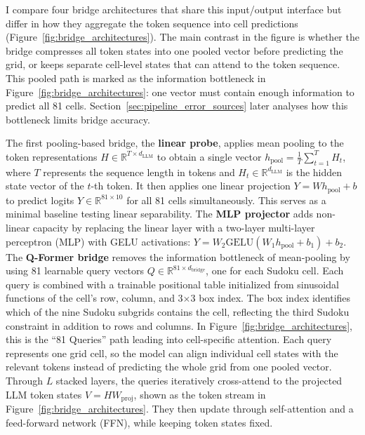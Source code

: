 \documentclass[11pt]{article}
\begin{document}
I compare four bridge architectures that share this input/output interface but differ in how they aggregate the token sequence into cell predictions (Figure~\ref{fig:bridge_architectures}).
The main contrast in the figure is whether the bridge compresses all token states into one pooled vector before predicting the grid, or keeps separate cell-level states that can attend to the token sequence.
This pooled path is marked as the information bottleneck in Figure~\ref{fig:bridge_architectures}: one vector must contain enough information to predict all 81 cells.
Section~\ref{sec:pipeline_error_sources} later analyses how this bottleneck limits bridge accuracy.

The first pooling-based bridge, the \textbf{linear probe}, applies mean pooling to the token representations $H \in \mathbb{R}^{T \times d_{\text{LLM}}}$ to obtain a single vector $h_{\text{pool}} = \frac{1}{T} \sum_{t=1}^T H_t$, where $T$ represents the sequence length in tokens and $H_t \in \mathbb{R}^{d_{\text{LLM}}}$ is the hidden state vector of the $t$-th token.
It then applies one linear projection $Y = W h_{\text{pool}} + b$ to predict logits $Y \in \mathbb{R}^{81 \times 10}$ for all 81 cells simultaneously.
This serves as a minimal baseline testing linear separability.
The \textbf{MLP projector} adds non-linear capacity by replacing the linear layer with a two-layer multi-layer perceptron (MLP) with GELU activations: $Y = W_2 \text{GELU}(W_1 h_{\text{pool}} + b_1) + b_2$.
The \textbf{Q-Former bridge} \cite{liBLIP2BootstrappingLanguageImage2023} removes the information bottleneck of mean-pooling by using 81 learnable query vectors $Q \in \mathbb{R}^{81 \times d_{\text{bridge}}}$, one for each Sudoku cell.
Each query is combined with a trainable positional table initialized from sinusoidal functions of the cell's row, column, and 3$\times$3 box index.
The box index identifies which of the nine Sudoku subgrids contains the cell, reflecting the third Sudoku constraint in addition to rows and columns.
In Figure~\ref{fig:bridge_architectures}, this is the ``81 Queries'' path leading into cell-specific attention.
Each query represents one grid cell, so the model can align individual cell states with the relevant tokens instead of predicting the whole grid from one pooled vector.
Through $L$ stacked layers, the queries iteratively cross-attend to the projected LLM token states $V = H W_{\text{proj}}$, shown as the token stream in Figure~\ref{fig:bridge_architectures}.
They then update through self-attention and a feed-forward network (FFN), while keeping token states fixed.
\end{document}
